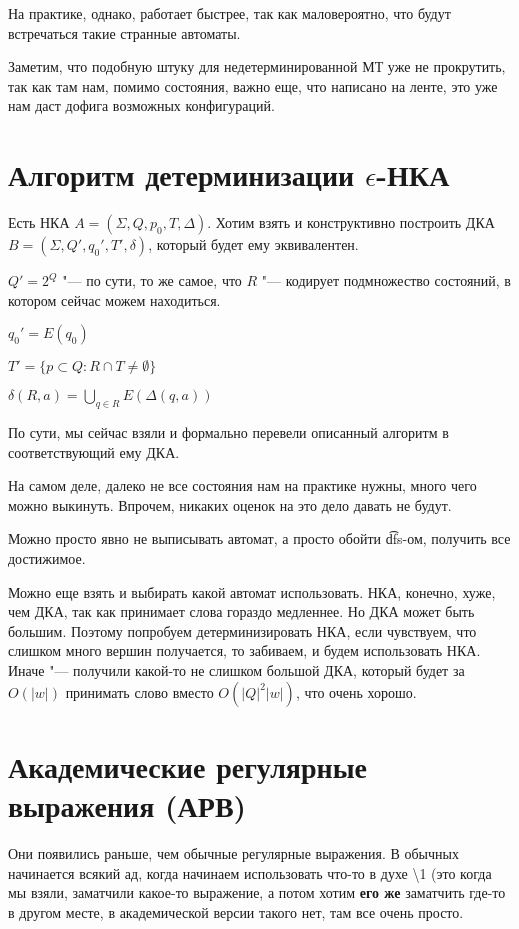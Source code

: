\begin{Rem}
На практике, однако, работает быстрее, так как маловероятно, что будут встречаться такие странные автоматы.
\end{Rem}

\begin{Rem}
Заметим, что подобную штуку для недетерминированной МТ уже не прокрутить, так как там нам, помимо состояния, важно еще, что написано на ленте, это уже нам даст дофига возможных конфигураций.
\end{Rem}


\section{Алгоритм детерминизации \texorpdfstring{$\epsilon$}{epsilon}-НКА}
Есть НКА $A = (\Sigma, Q, p_0, T, \Delta)$. 
Хотим взять и конструктивно построить ДКА $B = (\Sigma, Q', q_0', T', \delta)$, который будет ему эквивалентен.

$Q' = 2^Q$ "--- по сути, то же самое, что $R$ "--- кодирует подмножество состояний, в котором сейчас можем находиться.

$q_0' = E(q_0)$

$T' = \{p \subset Q: R\cap T \neq \emptyset\}$

$\delta(R, a) = \bigcup\limits_{q \in R} E(\Delta(q, a))$

По сути, мы сейчас взяли и формально перевели описанный алгоритм в соответствующий ему ДКА.

\begin{Rem}
На самом деле, далеко не все состояния нам на практике нужны, много чего можно выкинуть. Впрочем, никаких оценок на это дело давать не будут.

Можно просто явно не выписывать автомат, а просто обойти \t{dfs}-ом, получить все достижимое.

Можно еще взять и выбирать какой автомат использовать. 
НКА, конечно, хуже, чем ДКА, так как принимает слова гораздо медленнее. Но ДКА может быть большим. 
Поэтому попробуем детерминизировать НКА, если чувствуем, что слишком много вершин получается, то забиваем, и будем использовать НКА. 
Иначе "--- получили какой-то не слишком большой ДКА, который будет за $O(|w|)$ принимать слово вместо $O(|Q|^2|w|)$, что очень хорошо.
\end{Rem}


\section{Академические регулярные выражения (АРВ)}
Они появились раньше, чем обычные регулярные выражения. В обычных начинается всякий ад, когда начинаем использовать что-то в духе \textbackslash1
(это когда мы взяли, заматчили какое-то выражение, а потом хотим \textbf{его же} заматчить где-то в другом месте, в академической версии такого нет, там все очень просто.

